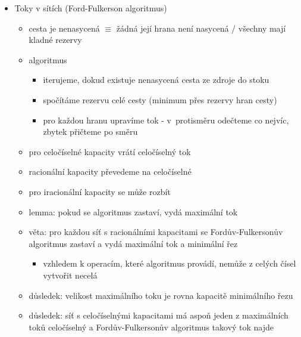 \begin{itemize}
\begin{itemize}
\begin{itemize}
\item paralelní verze Jarníkova algoritmu
\item na začátku $T$ obsahuje izolované vrcholy grafu
\item dokud $T$ není souvislý:
\begin{itemize}
\item rozložíme $T$ na komponenty souvislosti
\item pro každou komponentu najdeme nejlehčí hranu mezi komponentou a zbytkem vrcholů a přidáme ji do $T$
\end{itemize}
\item složitost
\begin{itemize}
\item rozklad na komponenty v $O(n+m)$, ale taky $O(m)$ díky souvislosti
\item nalezení nejlehčích hran v $O(m)$
\item algoritmus se zastaví po nejvýše $\lfloor\log n\rfloor$ iteracích
\item z toho plyne složitost $O(m\log n)$
\end{itemize}
\end{itemize}
\end{itemize}
\item Toky v sítích (Ford-Fulkerson algoritmus)
\begin{itemize}
\item cesta je nenasycená $\equiv$ žádná její hrana není nasycená / všechny mají kladné rezervy
\item algoritmus
\begin{itemize}
\item iterujeme, dokud existuje nenasycená cesta ze zdroje do stoku
\item spočítáme rezervu celé cesty (minimum přes rezervy hran cesty)
\item pro každou hranu upravíme tok - v~protisměru odečteme co nejvíc, zbytek přičteme po směru
\end{itemize}
\item pro celočíselné kapacity vrátí celočíselný tok
\item racionální kapacity převedeme na celočíselné
\item pro iracionální kapacity se může rozbít
\item lemma: pokud se algoritmus zastaví, vydá maximální tok
\item věta: pro každou síť s racionálními kapacitami se Fordův-Fulkersonův algoritmus zastaví a vydá maximální tok a minimální řez
\begin{itemize}
\item vzhledem k operacím, které algoritmus provádí, nemůže z celých čísel vytvořit necelá
\end{itemize}
\item důsledek: velikost maximálního toku je rovna kapacitě minimálního řezu
\item důsledek: síť s celočíselnými kapacitami má aspoň jeden z maximálních toků celočíselný a Fordův-Fulkersonův algoritmus takový tok najde
\end{itemize}
\end{itemize}
